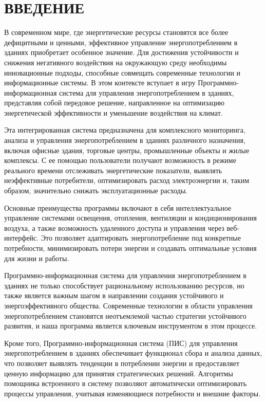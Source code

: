 \section*{ВВЕДЕНИЕ}

В современном мире, где энергетические ресурсы становятся все более дефицитными и ценными, эффективное управление энергопотреблением в зданиях приобретает особенное значение. Для достижения устойчивости и снижения негативного воздействия на окружающую среду необходимы инновационные подходы, способные совмещать современные технологии и информационные системы. В этом контексте вступает в игру Программно-информационная система для управления энергопотреблением в зданиях, представляя собой передовое решение, направленное на оптимизацию энергетической эффективности и уменьшение воздействия на климат.

Эта интегрированная система предназначена для комплексного мониторинга, анализа и управления энергопотреблением в зданиях различного назначения, включая офисные здания, торговые центры, промышленные объекты и жилые комплексы. С ее помощью пользователи получают возможность в режиме реального времени отслеживать энергетические показатели, выявлять неэффективные потребители, оптимизировать расход электроэнергии и, таким образом, значительно снижать эксплуатационные расходы.

Основные преимущества программы включают в себя интеллектуальное управление системами освещения, отопления, вентиляции и кондиционирования воздуха, а также возможность удаленного доступа и управления через веб-интерфейс. Это позволяет адаптировать энергопотребление под конкретные потребности, минимизировать потери энергии и создавать оптимальные условия для жизни и работы.

Программно-информационная система для управления энергопотреблением в зданиях не только способствует рациональному использованию ресурсов, но также является важным шагом в направлении создания устойчивого и энергоэффективного общества. Современные технологии в области управления энергопотреблением становятся неотъемлемой частью стратегии устойчивого развития, и наша программа является ключевым инструментом в этом процессе.

Кроме того, Программно-информационная система (ПИС) для управления энергопотреблением в зданиях обеспечивает функционал сбора и анализа данных, что позволяет выявлять тенденции в потреблении энергии и предоставляет ценную информацию для принятия стратегических решений. Алгоритмы помощника встроенного в систему позволяют автоматически оптимизировать процессы управления, учитывая изменяющиеся потребности и внешние факторы.

